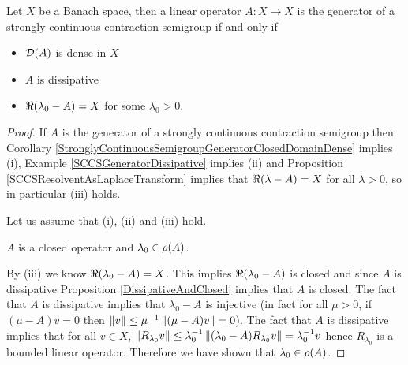 \begin{thm}\label{HilleYosidaTheorem}Let $X$ be a Banach space, then a linear operator $A : X \to X$ is the generator of a strongly continuous contraction semigroup if and only if 
\begin{itemize}
\item[(i)] $ \mathcal{D}(A)$ is dense in $X$
\item[(ii)] $A$ is dissipative
\item[(iii)] $\Re(\lambda_0 -A) = X$ for some $\lambda_0 > 0$.
\end{itemize}
\end{thm}
\begin{proof}
If $A$ is the generator of a strongly continuous contraction semigroup then Corollary \ref{StronglyContinuousSemigroupGeneratorClosedDomainDense} implies (i), Example \ref{SCCSGeneratorDissipative} implies (ii) and Proposition \ref{SCCSResolventAsLaplaceTransform} implies that $\Re(\lambda -A) = X$ for all $\lambda > 0$, so in particular (iii) holds.

Let us assume that (i), (ii) and (iii) hold.  

\begin{clm} $A$ is a closed operator and $\lambda_0 \in \rho(A)$.
\end{clm}
By (iii) we know $\Re(\lambda_0 -A) = X$.  This implies $\Re(\lambda_0 -A)$ is closed and since $A$ is dissipative Proposition \ref{DissipativeAndClosed} implies that $A$ is closed.  The fact that $A$ is dissipative implies that $\lambda_0 -A$ is injective (in fact for all $\mu > 0$, if $(\mu -A)v=0$ then $\left \lVert v \right \rVert \leq \mu^{-1} \left \lVert (\mu -A)v \right \rVert = 0$).  The fact that $A$ is dissipative implies that for all $v \in X$, $\left \lVert R_{\lambda_0} v \right \rVert \leq \lambda_0^{-1} \left \lVert (\lambda_0 -A)R_{\lambda_0} v \right \rVert = \lambda_0^{-1} v$ hence $R_{\lambda_0}$ is a bounded linear operator.  Therefore we have shown that $\lambda_0 \in \rho(A)$.


\end{proof}
